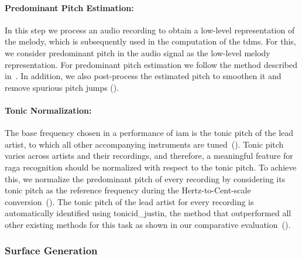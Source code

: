 \paragraph{Predominant Pitch Estimation:} In this step we process an audio recording to obtain a low-level representation of the melody, which is subsequently used in the computation of the \gls{tdms}. For this, we consider predominant pitch in the audio signal as the low-level melody representation. For predominant pitch estimation we follow the method described in~. In addition, we also post-process the estimated pitch to smoothen it and remove spurious pitch jumps ().


\paragraph{Tonic Normalization:} The base frequency chosen in a performance of \gls{iam} is the tonic pitch of the lead artist, to which all other accompanying instruments are tuned~(). 
Tonic pitch varies across artists and their recordings, and therefore, a meaningful feature for \gls{raga} recognition should be normalized with respect to the tonic pitch. To achieve this, we normalize the predominant pitch of every recording by considering its tonic pitch as the reference frequency during the Hertz-to-Cent-scale conversion~(). The tonic pitch of the lead artist for every recording is automatically identified using \acrshort{tonicid_justin}, the method that outperformed all other existing methods for this task as shown in our comparative evaluation~(). 

\subsubsection{Surface Generation}
\label{sec:tdms_surface_generation}

